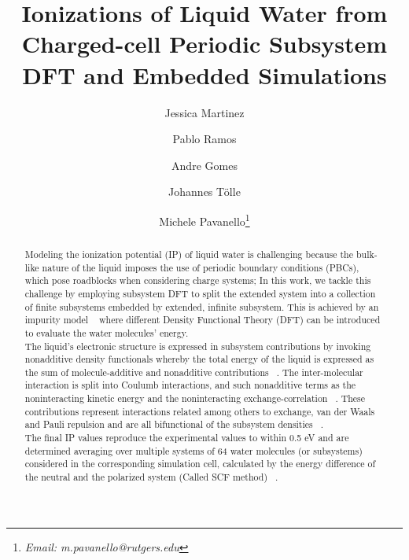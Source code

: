 \documentclass[12pt,a4paper]{article}
\begin{document}
\title{Ionizations of Liquid Water from Charged-cell Periodic Subsystem DFT and Embedded Simulations}
\author[1]{Jessica Martinez}
\author[1]{Pablo Ramos}
\author[2]{Andre Gomes}
\author[3]{Johannes Tölle}
\author[1]{Michele Pavanello\thanks{\textit{Email: m.pavanello@rutgers.edu}}}
\date{}
\setcounter{Maxaffil}{0}
\renewcommand\Affilfont{\itshape\small}
\begin{titlepage}
  \maketitle
\end{titlepage}

\begin{abstract}
Modeling the ionization potential (IP) of liquid water is challenging because the bulk-like nature of the liquid imposes
the use of periodic boundary conditions (PBCs), which pose roadblocks when considering charge systems; In this work, we tackle
this challenge by employing subsystem DFT to split the extended system into a collection of finite
subsystems embedded by extended, infinite subsystem. This is achieved by an impurity
model ~\cite{tolle2019charged} where different Density Functional Theory (DFT) can be introduced 
to evaluate the water molecules’ energy. \\

The liquid’s electronic structure is expressed in subsystem contributions by invoking nonadditive density 
functionals whereby the total energy of the liquid is expressed as the sum of molecule-additive
and nonadditive contributions ~\cite{krishtal2015subsystem}. The inter-molecular interaction is
split into Coulumb interactions, and such nonadditive terms as the noninteracting
kinetic energy and the noninteracting exchange-correlation ~\cite{krishtal2015subsystem}. 
These contributions represent interactions related among others to exchange, van der Waals and
Pauli repulsion and are all bifunctional of the subsystem densities ~\cite{tolle2019charged}. \\

The final IP values reproduce the experimental values to within 0.5 eV and are determined averaging 
over multiple systems of 64 water molecules (or subsystems) considered in the corresponding simulation
cell, calculated by the energy difference of the neutral and the polarized system (Called SCF method) 
~\cite{bagus1965self,waskom2017mwaskom}.\\
\end{abstract}
\end{document}
